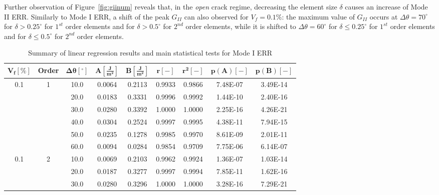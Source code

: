 \documentclass[review]{elsarticle}
\begin{document}
Further observation of Figure~\ref{fig:giinum} reveals that, in the \emph{open} crack regime, decreasing the element size $\delta$ causes an increase of Mode II ERR. Similarly to Mode I ERR, a shift of the peak $G_{II}$ can also observed for $V_{f}=0.1\%$: the maximum value of $G_{II}$ occurs at $\Delta\theta=70^{\circ}$ for $\delta>0.25^{\circ}$ for $1^{st}$ order elements and for $\delta>0.5^{\circ}$ for $2^{nd}$ order elements, while it is shifted to $\Delta\theta=60^{\circ}$ for $\delta\leq0.25^{\circ}$ for $1^{st}$ order elements and for $\delta\leq0.5^{\circ}$ for $2^{nd}$ order elements.

\begin{table}[!h]
 \centering
 \caption{Summary of linear regression results and main statistical tests for Mode I ERR}\label{tab:GIinterp}
 \begin{tabular}{ccccccccc}
\small$\mathbf{V_{f} \left[\%\right]}$&\small\bf{Order}&\small$\mathbf{\Delta\theta \left[^{\circ}\right]}$&\small$\mathbf{A\left[\frac{J}{m^{2}}\right]}$ &\small$\mathbf{B\left[\frac{J}{m^{2}}\right]}$ &\small $\mathbf{r\left[-\right]}$ &\small $\mathbf{r^{2}\left[-\right]}$ &\small $\mathbf{p(A)\left[-\right]}$ &\small $\mathbf{p(B)\left[-\right]}$\\
\toprule
\midrule
\small0.1&\small1&	\small10.0&	\small0.0064&	\small0.2113&	\small0.9933&	\small0.9866&	\small7.48E-07&	\small3.49E-14\\
&&		\small20.0& \small0.0183&\small	0.3331&\small	0.9996&\small	0.9992&\small	1.44E-10&\small	2.40E-16\\
&&		\small30.0&	\small0.0280&\small	0.3392&\small	1.0000&\small	1.0000&\small	2.25E-16&\small	4.26E-21\\
&&		\small40.0&	\small0.0304&\small	0.2524&\small	0.9997&\small	0.9995&\small	4.38E-11&\small	7.94E-15\\
&&		\small50.0&	\small0.0235&\small	0.1278&\small	0.9985&\small	0.9970&\small	8.61E-09&\small	2.01E-11\\
&&		\small60.0&	\small0.0094&\small	0.0284&\small	0.9854&\small	0.9709&\small	7.75E-06&\small	6.14E-07\\
\midrule
\small0.1&\small2&	\small10.0&	\small0.0069&	\small0.2103&	\small0.9962&	\small0.9924&	\small1.36E-07&	\small1.03E-14\\
&&		\small20.0&	\small0.0187&\small	0.3277&\small	0.9997&\small	0.9994&\small	7.85E-11&\small	1.62E-16\\
&&		\small30.0&	\small0.0280&\small	0.3296&\small	1.0000&\small	1.0000&\small	3.28E-16&\small	7.29E-21\\

\end{tabular}
\end{table}
\end{document}
